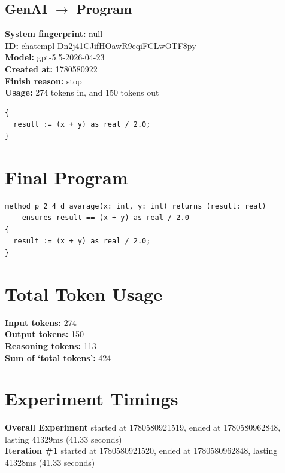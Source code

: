 \documentclass{article}
\begin{document}
\subsection*{GenAI $\rightarrow$ Program}
\textbf{System fingerprint: }null
\\\textbf{ID: }chatcmpl-Dn2j41CJifHOawR9eqiFCLwOTF8py
\\\textbf{Model: }gpt-5.5-2026-04-23
\\\textbf{Created at: }1780580922
\\\textbf{Finish reason: }stop
\\\textbf{Usage: }274 tokens in, and 150 tokens out
\begin{lstlisting}
{
  result := (x + y) as real / 2.0;
}
\end{lstlisting}
\section*{Final Program}
\begin{lstlisting}
method p_2_4_d_avarage(x: int, y: int) returns (result: real)
	ensures result == (x + y) as real / 2.0
{
  result := (x + y) as real / 2.0;
}
\end{lstlisting}
\section*{Total Token Usage}
\textbf{Input tokens: }274
\\\textbf{Output tokens: }150
\\\textbf{Reasoning tokens: }113
\\\textbf{Sum of `total tokens': }424
\section*{Experiment Timings}
\textbf{Overall Experiment} started at 1780580921519, ended at 1780580962848, lasting 41329ms (41.33 seconds)
\\\textbf{Iteration \#1} started at 1780580921520, ended at 1780580962848, lasting 41328ms (41.33 seconds)
\end{document}

